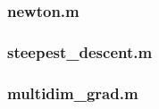 \documentclass[a4paper,11pt]{article}
\numberwithin{equation}{section} %
\begin{document}
\pagebreak



\subsection{}









\subsubsection{newton.m}



\subsubsection{steepest\_descent.m}



\subsubsection{multidim\_grad.m}
\end{document}
